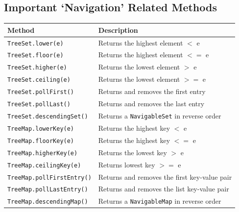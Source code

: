 \subsection{Important `Navigation' Related Methods}
\begin{center}
\begin{tabular}{ll}
    \textbf{Method} & \textbf{Description} \\
    \hline
    \verb#TreeSet.lower(e)# & Returns the highest element $<$ e \\
    \verb#TreeSet.floor(e)# & Returns the highest element $<=$ e \\
    \verb#TreeSet.higher(e)# & Returns the lowest element $>$ e \\
    \verb#TreeSet.ceiling(e)# & Returns the lowest element $>=$ e \\
    \verb#TreeSet.pollFirst()# & Returns and removes the first entry \\
    \verb#TreeSet.pollLast()# & Returns and removes the last entry \\
    \verb#TreeSet.descendingSet()# & Returns a \verb#NavigableSet# in reverse 
    order \\
    \hline
    \verb#TreeMap.lowerKey(e)# & Returns the highest key $<$ e \\
    \verb#TreeMap.floorKey(e)# & Returns the highest key $<=$ e \\
    \verb#TreeMap.higherKey(e)# & Returns the lowest key $>$ e \\
    \verb#TreeMap.ceilingKey(e)# & Returns lowest key $>=$ e \\
    \verb#TreeMap.pollFirstEntry()# & Returns and removes the first key-value 
    pair \\
    \verb#TreeMap.pollLastEntry()# & Returns and removes the list key-value 
    pair \\
    \verb#TreeMap.descendingMap()# & Returns a \verb#NavigableMap# in reverse 
    order \\
\end{tabular}
\end{center}


